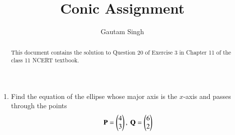 \documentclass[journal,12pt,twocolumn]{IEEEtran}
\renewcommand{\vec}[1]{\boldsymbol{\mathbf{#1}}}
\begin{document}
\vspace{3cm}
\title{Conic Assignment}
\author{Gautam Singh}
\maketitle
\bigskip

\begin{abstract}
    This document contains the solution to Question 20 of Exercise 3 in Chapter
    11 of the class 11 NCERT textbook.
\end{abstract}

\begin{enumerate}
    \item Find the equation of the ellipse whose major axis is the $x$-axis and
    passes through the points
    \begin{align}
        \vec{P} = \myvec{4\\3},\ \vec{Q} = \myvec{6\\2}
    \end{align}


\end{enumerate}
\end{document}
